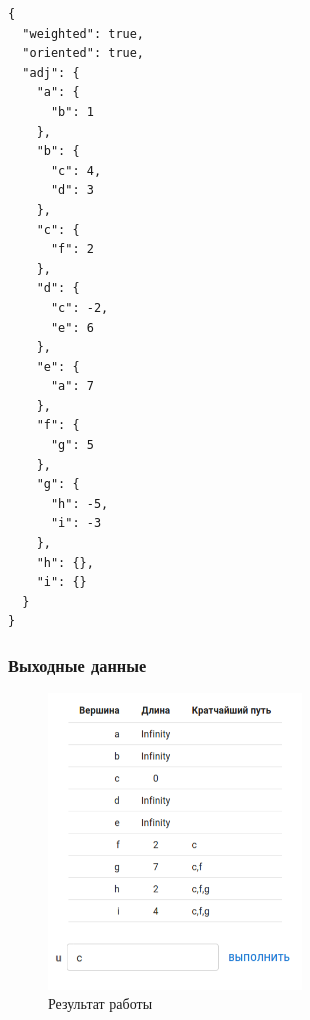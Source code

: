 \begin{verbatim}
{
  "weighted": true,
  "oriented": true,
  "adj": {
    "a": {
      "b": 1
    },
    "b": {
      "c": 4,
      "d": 3
    },
    "c": {
      "f": 2
    },
    "d": {
      "c": -2,
      "e": 6
    },
    "e": {
      "a": 7
    },
    "f": {
      "g": 5
    },
    "g": {
      "h": -5,
      "i": -3
    },
    "h": {},
    "i": {}
  }
}
\end{verbatim}

\subsubsection{Выходные данные}
\begin{figure}[H]
  \centering\includegraphics[width=0.6\textwidth]{figs/task-9/res-9.png}
  \caption{Результат работы}
\end{figure}